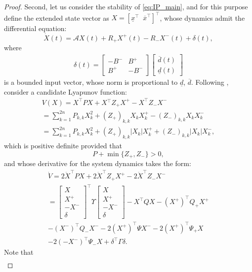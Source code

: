 \documentclass[letterpaper, 10 pt, conference]{ieeeconf}
\theoremstyle{plain}
\theoremstyle{definition}
\theoremstyle{plain}
\theoremstyle{plain}
\theoremstyle{remark}
\begin{document}
\begin{proof}
Second, let us consider the stability of \eqref{eq:IP_main}, and for this purpose define the extended state vector as $X=[\underline{x}^{\top}\;\;\overline{x}^{\top}]^{\top}$, whose dynamics admit the differential equation:
\[
\dot{X}(t)=\mathcal{A}X(t)+R_{+}X^{+}(t)-R_{-}X^{-}(t)+\delta(t),
\]
where
\begin{gather*}
\delta(t)=\left[\begin{array}{cc}
-B^{-} & B^{+}\\
B^{+} & -B^{-}
\end{array}\right]\left[\begin{array}{c}
\overline{d}(t)\\
\underline{d}(t)
\end{array}\right]
\end{gather*}
is a bounded input vector, whose norm is proportional to $\underline{d}$,
$\overline{d}$. Following \cite{Efimov_CDC2019}, consider a candidate Lyapunov function:
\begin{gather*}
V(X)=X^{\top}PX+X{}^{\top}Z_{+}X^{+}-X^{\top}Z_{-}X^{-}\\
=\sum_{k=1}^{2n}P_{k,k}X_{k}^{2}+(Z_{+})_{k,k}X_{k}X_{k}^{+}-(Z_{-})_{k,k}X_{k}X_{k}^{-}\\
=\sum_{k=1}^{2n}P_{k,k}X_{k}^{2}+(Z_{+})_{k,k}|X_{k}|X_{k}^{+}+(Z_{-})_{k,k}|X_{k}|X_{k}^{-},
\end{gather*}
which is positive definite provided that
\[
P+\min\{Z_{+},Z_{-}\}>0,
\]
and whose derivative for the system dynamics takes the form:
\begin{gather*}
\dot{V}=2\dot{X}^{\top}PX+2\dot{X}^{\top}Z_{+}X^{+}-2\dot{X}^{\top}Z_{-}X^{-}\\
=\left[\begin{array}{c}
X\\
X^{+}\\
-X^{-}\\
\delta
\end{array}\right]^{\top}\Upsilon\left[\begin{array}{c}
X\\
X^{+}\\
-X^{-}\\
\delta
\end{array}\right]-X^{\top}QX-(X^{+})^{\top}Q_{+}X^{+}\\
-(X^{-})^{\top}Q_{-}X^{-}-2(X^{+})^{\top}\Psi X^{-}-2(X^{+})^{\top}\Psi_{+}X\\
-2(-X^{-})^{\top}\Psi_{-}X+\delta^{\top}\Gamma\delta.
\end{gather*}
Note that
\begin{gather*}

\end{gather*}
\end{proof}
\end{document}
